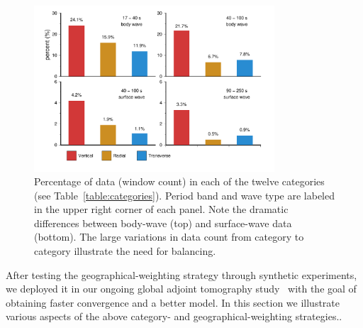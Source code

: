 \begin{figure}
\centering
\includegraphics[width=0.8\textwidth]{ch-weighting/figures/category_wincount_contribution.pdf}
  \caption[Percentage of data in the twelve categories]
  {\small{Percentage of data (window count) in each of the twelve categories (see Table~\ref{table:categories}).
Period band and wave type are  labeled in the upper right corner of each panel.
Note the dramatic differences between  
body-wave (top) and surface-wave data (bottom). 
The large variations in data count from category to category illustrate the 
need for balancing.
}}
\label{fig:wcounts_contribution}
\end{figure}

After testing the geographical-weighting strategy through synthetic experiments,
we deployed it in our ongoing
global adjoint tomography study~\cite{Lei2018} with the goal of obtaining faster convergence and a 
better model. In this section we illustrate various aspects of the above category- and geographical-weighting
strategies.. 

